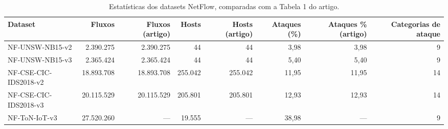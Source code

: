\begin{table}[ht]
\centering
\caption{Estatísticas dos datasets NetFlow, comparadas com a Tabela 1 do artigo.}
\label{tab:resumo-datasets}
\begin{tabular}{lrrrrrrr}
\toprule
Dataset & Fluxos & Fluxos (artigo) & Hosts & Hosts (artigo) & Ataques (\%) & Ataques \% (artigo) & Categorias de ataque \\
\midrule
NF-UNSW-NB15-v2 & 2.390.275 & 2.390.275 & 44 & 44 & 3,98 & 3,98 & 9 \\
NF-UNSW-NB15-v3 & 2.365.424 & 2.365.424 & 44 & 44 & 5,40 & 5,40 & 9 \\
NF-CSE-CIC-IDS2018-v2 & 18.893.708 & 18.893.708 & 255.042 & 255.042 & 11,95 & 11,95 & 14 \\
NF-CSE-CIC-IDS2018-v3 & 20.115.529 & 20.115.529 & 205.801 & 205.801 & 12,93 & 12,93 & 14 \\
NF-ToN-IoT-v3 & 27.520.260 & — & 19.555 & — & 38,98 & — & 9 \\
\bottomrule
\end{tabular}
\end{table}
